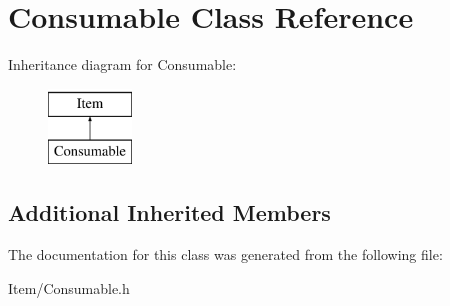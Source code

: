 \hypertarget{classConsumable}{\section{Consumable Class Reference}
\label{classConsumable}
}
Inheritance diagram for Consumable\-:\begin{figure}[H]
\begin{center}
\leavevmode
\includegraphics[height=2.000000cm]{classConsumable}
\end{center}
\end{figure}
\subsection*{Additional Inherited Members}


The documentation for this class was generated from the following file\-:\begin{DoxyCompactItemize}
\item 
Item/Consumable.\-h\end{DoxyCompactItemize}
